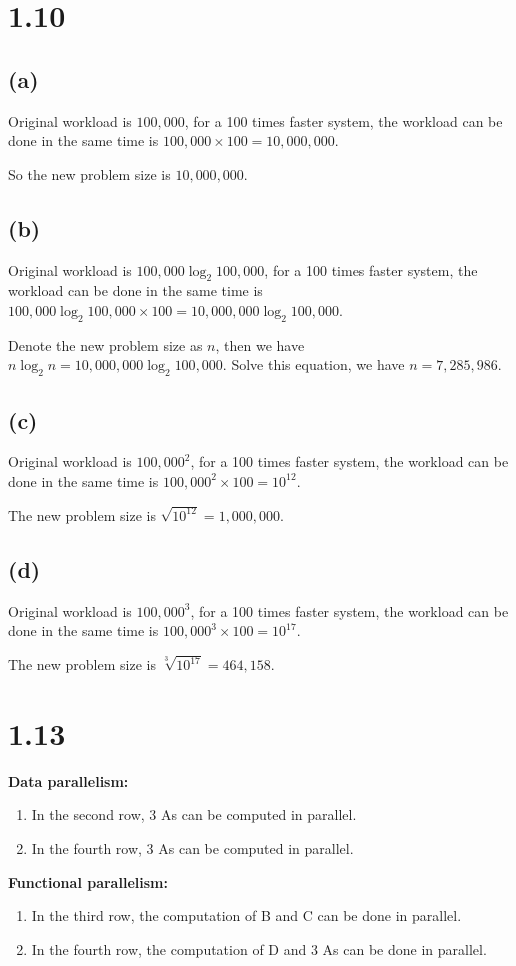 \section*{1.10}
\subsection*{(a)}

Original workload is $100,000$, for a 100 times faster system, the workload can be done in the same time is $100,000 \times 100 = 10,000,000$.

So the new problem size is $10,000,000$.

\subsection*{(b)}

Original workload is $100,000\log_2 100,000$, for a 100 times faster system, the workload can be done in the same time is $100,000\log_2 100,000 \times 100 = 10,000,000\log_2 100,000$.

Denote the new problem size as $n$, then we have $n\log_2 n = 10,000,000\log_2 100,000$. Solve this equation, we have $n = 7,285,986$.

\subsection*{(c)}

Original workload is $100,000^2$, for a 100 times faster system, the workload can be done in the same time is $100,000^2 \times 100 = 10^{12}$.

The new problem size is $\sqrt{10^{12}}=1,000,000$.

\subsection*{(d)}

Original workload is $100,000^3$, for a 100 times faster system, the workload can be done in the same time is $100,000^3 \times 100 = 10^{17}$.

The new problem size is $\sqrt[3]{10^{17}}=464,158$.

\section*{1.13}

\textbf{Data parallelism:}
\begin{enumerate}
    \item In the second row, 3 As can be computed in parallel.
    \item In the fourth row, 3 As can be computed in parallel.
\end{enumerate}
\textbf{Functional parallelism:}
\begin{enumerate}
    \item In the third row, the computation of B and C can be done in parallel.
    \item In the fourth row, the computation of D and 3 As can be done in parallel.
\end{enumerate}

